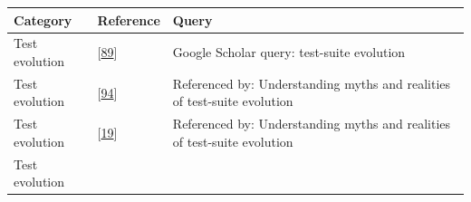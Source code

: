 \documentclass[]{book}
\begin{document}
\begin{longtable}[]{@{}lll@{}}
\toprule
\begin{minipage}[b]{0.19\columnwidth}\raggedright\strut
Category\strut
\end{minipage} & \begin{minipage}[b]{0.41\columnwidth}\raggedright\strut
Reference\strut
\end{minipage} & \begin{minipage}[b]{0.32\columnwidth}\raggedright\strut
Query\strut
\end{minipage}\tabularnewline
\midrule
\endhead
\begin{minipage}[t]{0.19\columnwidth}\raggedright\strut
Test evolution\strut
\end{minipage} & \begin{minipage}[t]{0.41\columnwidth}\raggedright\strut
{[}\protect\hyperlink{ref-supportingtestsuite}{89}{]}\strut
\end{minipage} & \begin{minipage}[t]{0.32\columnwidth}\raggedright\strut
Google Scholar query: test-suite evolution\strut
\end{minipage}\tabularnewline
\begin{minipage}[t]{0.19\columnwidth}\raggedright\strut
Test evolution\strut
\end{minipage} & \begin{minipage}[t]{0.41\columnwidth}\raggedright\strut
{[}\protect\hyperlink{ref-pinto2013}{94}{]}\strut
\end{minipage} & \begin{minipage}[t]{0.32\columnwidth}\raggedright\strut
Referenced by: Understanding myths and realities of test-suite
evolution\strut
\end{minipage}\tabularnewline
\begin{minipage}[t]{0.19\columnwidth}\raggedright\strut
Test evolution\strut
\end{minipage} & \begin{minipage}[t]{0.41\columnwidth}\raggedright\strut
{[}\protect\hyperlink{ref-bevan2005}{19}{]}\strut
\end{minipage} & \begin{minipage}[t]{0.32\columnwidth}\raggedright\strut
Referenced by: Understanding myths and realities of test-suite
evolution\strut
\end{minipage}\tabularnewline
\begin{minipage}[t]{0.19\columnwidth}\raggedright\strut
Test evolution\strut
\end{minipage} & \begin{minipage}[t]{0.41\columnwidth}\raggedright\strut

\end{minipage}
\end{longtable}
\end{document}
